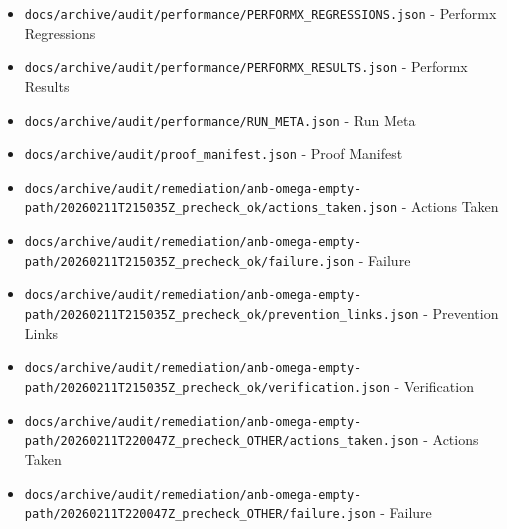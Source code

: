\documentclass[10.5pt,a4paper,openany]{book}
\begin{document}
\begin{itemize}
\item \texttt{docs/\allowbreak{}archive/\allowbreak{}audit/\allowbreak{}performance/\allowbreak{}PERFORMX\_\allowbreak{}REGRESSIONS.\allowbreak{}json} -\allowbreak{} Performx Regressions
\item \texttt{docs/\allowbreak{}archive/\allowbreak{}audit/\allowbreak{}performance/\allowbreak{}PERFORMX\_\allowbreak{}RESULTS.\allowbreak{}json} -\allowbreak{} Performx Results
\item \texttt{docs/\allowbreak{}archive/\allowbreak{}audit/\allowbreak{}performance/\allowbreak{}RUN\_\allowbreak{}META.\allowbreak{}json} -\allowbreak{} Run Meta
\item \texttt{docs/\allowbreak{}archive/\allowbreak{}audit/\allowbreak{}proof\_\allowbreak{}manifest.\allowbreak{}json} -\allowbreak{} Proof Manifest
\item \texttt{docs/\allowbreak{}archive/\allowbreak{}audit/\allowbreak{}remediation/\allowbreak{}anb-\allowbreak{}omega-\allowbreak{}empty-\allowbreak{}path/\allowbreak{}20260211T215035Z\_\allowbreak{}precheck\_\allowbreak{}ok/\allowbreak{}actions\_\allowbreak{}taken.\allowbreak{}json} -\allowbreak{} Actions Taken
\item \texttt{docs/\allowbreak{}archive/\allowbreak{}audit/\allowbreak{}remediation/\allowbreak{}anb-\allowbreak{}omega-\allowbreak{}empty-\allowbreak{}path/\allowbreak{}20260211T215035Z\_\allowbreak{}precheck\_\allowbreak{}ok/\allowbreak{}failure.\allowbreak{}json} -\allowbreak{} Failure
\item \texttt{docs/\allowbreak{}archive/\allowbreak{}audit/\allowbreak{}remediation/\allowbreak{}anb-\allowbreak{}omega-\allowbreak{}empty-\allowbreak{}path/\allowbreak{}20260211T215035Z\_\allowbreak{}precheck\_\allowbreak{}ok/\allowbreak{}prevention\_\allowbreak{}links.\allowbreak{}json} -\allowbreak{} Prevention Links
\item \texttt{docs/\allowbreak{}archive/\allowbreak{}audit/\allowbreak{}remediation/\allowbreak{}anb-\allowbreak{}omega-\allowbreak{}empty-\allowbreak{}path/\allowbreak{}20260211T215035Z\_\allowbreak{}precheck\_\allowbreak{}ok/\allowbreak{}verification.\allowbreak{}json} -\allowbreak{} Verification
\item \texttt{docs/\allowbreak{}archive/\allowbreak{}audit/\allowbreak{}remediation/\allowbreak{}anb-\allowbreak{}omega-\allowbreak{}empty-\allowbreak{}path/\allowbreak{}20260211T220047Z\_\allowbreak{}precheck\_\allowbreak{}OTHER/\allowbreak{}actions\_\allowbreak{}taken.\allowbreak{}json} -\allowbreak{} Actions Taken
\item \texttt{docs/\allowbreak{}archive/\allowbreak{}audit/\allowbreak{}remediation/\allowbreak{}anb-\allowbreak{}omega-\allowbreak{}empty-\allowbreak{}path/\allowbreak{}20260211T220047Z\_\allowbreak{}precheck\_\allowbreak{}OTHER/\allowbreak{}failure.\allowbreak{}json} -\allowbreak{} Failure

\end{itemize}
\end{document}
